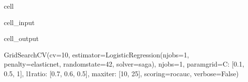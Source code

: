 \documentclass[letterpaper,10pt,english]{jupyterBook}
\begin{document}
\begin{sphinxuseclass}{cell}
\begin{sphinxVerbatimInput}
\begin{sphinxuseclass}{cell_input}
\end{sphinxuseclass}\end{sphinxVerbatimInput}
\begin{sphinxVerbatimOutput}

\begin{sphinxuseclass}{cell_output}
\begin{sphinxVerbatim}[commandchars=\\\{\}]
GridSearchCV(cv=10,
             estimator=LogisticRegression(n\PYGZus{}jobs=\PYGZhy{}1, penalty=\PYGZsq{}elasticnet\PYGZsq{},
                                          random\PYGZus{}state=42, solver=\PYGZsq{}saga\PYGZsq{}),
             n\PYGZus{}jobs=\PYGZhy{}1,
             param\PYGZus{}grid=\PYGZob{}\PYGZsq{}C\PYGZsq{}: [0.1, 0.5, 1], \PYGZsq{}l1\PYGZus{}ratio\PYGZsq{}: [0.7, 0.6, 0.5],
                         \PYGZsq{}max\PYGZus{}iter\PYGZsq{}: [10, 25]\PYGZcb{},
             scoring=\PYGZsq{}roc\PYGZus{}auc\PYGZsq{}, verbose=False)
\end{sphinxVerbatim}

\end{sphinxuseclass}\end{sphinxVerbatimOutput}

\end{sphinxuseclass}
\end{document}
